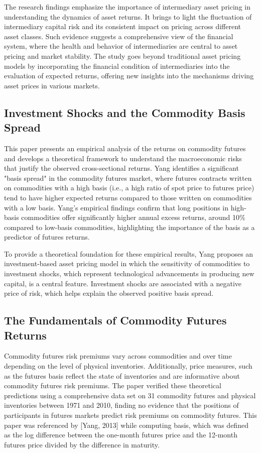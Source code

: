 \documentclass{article}
\begin{document}
The research findings emphasize the importance of intermediary asset pricing in understanding the dynamics of asset returns. It brings to light the fluctuation of intermediary capital risk and its consistent impact on pricing across different asset classes. Such evidence suggests a comprehensive view of the financial system, where the health and behavior of intermediaries are central to asset pricing and market stability. The study goes beyond traditional asset pricing models by incorporating the financial condition of intermediaries into the evaluation of expected returns, offering new insights into the mechanisms driving asset prices in various markets.

\subsection{Investment Shocks and the Commodity Basis Spread}

This paper presents an empirical analysis of the returns on commodity futures and develops a theoretical framework to understand the macroeconomic risks that justify the observed cross-sectional returns. Yang identifies a significant "basis spread" in the commodity futures market, where futures contracts written on commodities with a high basis (i.e., a high ratio of spot price to futures price) tend to have higher expected returns compared to those written on commodities with a low basis. Yang's empirical findings confirm that long positions in high-basis commodities offer significantly higher annual excess returns, around 10\% compared to low-basis commodities, highlighting the importance of the basis as a predictor of futures returns.

To provide a theoretical foundation for these empirical results, Yang proposes an investment-based asset pricing model in which the sensitivity of commodities to investment shocks, which represent technological advancements in producing new capital, is a central feature. Investment shocks are associated with a negative price of risk, which helps explain the observed positive basis spread.

\subsection{The Fundamentals of Commodity Futures Returns}

Commodity futures risk premiums vary across commodities and over time depending on the level of physical inventories. Additionally, price measures, such as the futures basis reflect the state of inventories and are informative about commodity futures risk premiums. The paper verified these theoretical predictions using a comprehensive data set on 31 commodity futures and physical inventories between 1971 and 2010, finding no evidence that the positions of participants in futures markets predict risk premiums on commodity futures. This paper was referenced by [Yang, 2013] while computing basis, which was defined as the log difference between the one-month futures price and the 12-month futures price divided by the difference in maturity.
\end{document}
